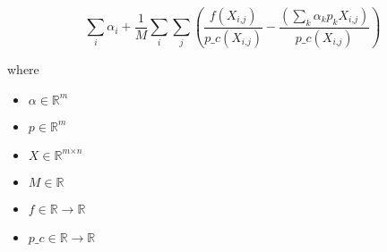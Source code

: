 \documentclass[12pt]{article}
\begin{document}
\[
\sum_\textit{i} \textit{α}_{ \textit{i} } + \frac{1}{\textit{M}}\sum_\textit{i} \sum_\textit{j} (\frac{\textit{f}(\textit{X}_{\textit{i}, \textit{j}})}{\textit{p\_c}(\textit{X}_{\textit{i}, \textit{j}})} - \frac{(\sum_\textit{k} \textit{α}_{ \textit{k} }\textit{p}_{ \textit{k} }\textit{X}_{\textit{i}, \textit{j}})}{\textit{p\_c}(\textit{X}_{\textit{i}, \textit{j}})})
\]

where
\begin{itemize}
\item $\textit{α} \in \mathbb{R}^{ \textit{m}}$
\item $\textit{p} \in \mathbb{R}^{ \textit{m}}$
\item $\textit{X} \in \mathbb{R}^{ \textit{m} \times \textit{n} }$
\item $\textit{M} \in \mathbb{{R}}$
\item $\textit{f} \in \mathbb{{R}}\rightarrow \mathbb{{R}}$
\item $\textit{p\_c} \in \mathbb{{R}}\rightarrow \mathbb{{R}}$
\end{itemize}
\end{document}
